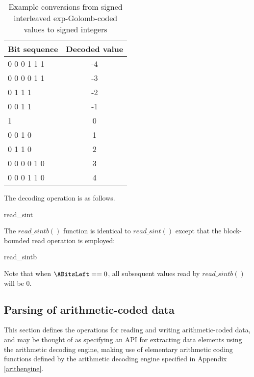 \begin{table}[!ht]
\centering
\begin{tabular}{|l|c|}
\hline
\rowcolor[gray]{0.75}Bit sequence & Decoded value \\
\hline
0 0 0 1 1 1         &  -4\\
0 0 0 0 1 1         &  -3\\
0 1 1 1            &  -2\\
0 0 1 1           &  -1\\
1                 &  0\\
0 0 1 0           &  1\\
0 1 1 0            &  2\\
0 0 0 0 1 0         &  3\\
0 0 0 1 1 0         &  4\\
\hline
\end{tabular}

\caption{Example conversions from signed interleaved exp-Golomb-coded values 
to signed integers \label{table:segolcodings}}
\end{table}

The decoding operation is as follows.

\begin{pseudo}{read\_sint}{}
  \bsEND
\bsEND
{}
\end{pseudo}

The $read\_sintb()$ function is identical to $read\_sint()$ except that the block-bounded read
operation is employed:

\begin{pseudo}{read\_sintb}{}
  \bsEND
\bsEND
{}
\end{pseudo}

Note that when $\ABitsLeft==0$, all subsequent values read by $read\_sintb()$ will be 0.

\subsection{Parsing of arithmetic-coded data}

\label{arithdecoding}

This section defines the operations for reading and writing arithmetic-coded
data, and may be thought of as specifying an API for
extracting data elements using the arithmetic decoding engine, making use
of elementary arithmetic coding functions defined by the arithmetic decoding engine 
specified in Appendix \ref{arithengine}.

